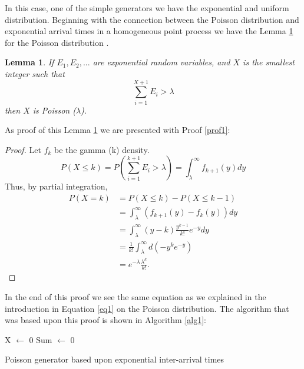 \documentclass{article}
\newtheorem{lemma}[theorem]{Lemma}
\begin{document}
\smallskip

In this case, one of the simple generators we have the exponential and uniform distribution. Beginning with the connection between the Poisson distribution and exponential arrival times in a homogeneous point process we have the Lemma \ref{lema1} for the Poisson distribution \cite{randvariates}.\\

\begin{lemma}\label{lema1}
If $E_1, E_2, ...$ are exponential random variables, and $X$ is the smallest integer such that \\
\begin{equation*}
\sum_{i=1}^{X+1}E_i>\lambda
\end{equation*}
then $X$ is Poisson ($\lambda$).
\end{lemma}

As proof of this Lemma \ref{lema1} we are presented with Proof \ref{prof1}:
\begin{proof}\label{prof1}
Let $f_k$ be the gamma (k) density. 
\begin{equation*}
P(X\leq k) = P (\sum_{i=1}^{k+1}E_i>\lambda) = \int_{\lambda}^\infty f_{k+1}(y)dy
\end{equation*}
Thus, by partial integration,
\begin{align*}
P(X=k) &= P (X \leq k ) - P (X\leq k-1) \\
&=\int_\lambda^\infty(f_{k+1}(y) - f_k (y)) dy\\
&=\int_\lambda^\infty(y-k) \frac{y^{k-1}}{k!} e^{-y} dy\\
&=\frac{1}{k!} \int_\lambda^\infty d(-y^k e^{-y})\\
&= e^{-\lambda} \frac{\lambda^k}{k!}.
\end{align*}
\end{proof}


In the end of this proof we see the same equation as we explained in the introduction in Equation \ref{eq1} on the Poisson distribution. The algorithm that was based upon this proof
is shown in Algorithm \ref{alg1}:\\

\begin{algorithm}[]
X $\leftarrow$ 0\;
Sum $\leftarrow$ 0\;
 \caption{Poisson generator based upon exponential inter-arrival times}\label{alg1}
\end{algorithm}
\end{document}

